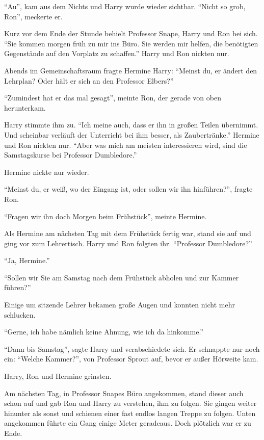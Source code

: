 \enquote{Au}, kam aus dem Nichts und Harry wurde wieder sichtbar. \enquote{Nicht so grob, Ron}, meckerte er.

Kurz vor dem Ende der Stunde behielt Professor Snape, Harry und Ron bei sich. \enquote{Sie kommen morgen früh zu mir ins Büro. Sie werden mir helfen, die benötigten Gegenstände auf den Vorplatz zu schaffen.} Harry und Ron nickten nur.

Abends im Gemeinschaftsraum fragte Hermine Harry: \enquote{Meinst du, er ändert den Lehrplan? Oder hält er sich an den Professor Elbers?}

\enquote{Zumindest hat er das mal gesagt}, meinte Ron, der gerade von oben herunterkam.

Harry stimmte ihm zu. \enquote{Ich meine auch, dass er ihn in großen Teilen übernimmt. Und scheinbar verläuft der Unterricht bei ihm besser, als Zaubertränke.} Hermine und Ron nickten nur. \enquote{Aber was mich am meisten interessieren wird, sind die Samstagskurse bei Professor Dumbledore.}

Hermine nickte nur wieder.

\enquote{Meinst du, er weiß, wo der Eingang ist, oder sollen wir ihn hinführen?}, fragte Ron.

\enquote{Fragen wir ihn doch Morgen beim Frühstück}, meinte Hermine.

\trenn

Als Hermine am nächsten Tag mit dem Frühstück fertig war, stand sie auf und ging vor zum Lehrertisch. Harry und Ron folgten ihr. \enquote{Professor Dumbledore?}

\enquote{Ja, Hermine.}

\enquote{Sollen wir Sie am Samstag nach dem Frühstück abholen und zur Kammer führen?}

Einige um sitzende Lehrer bekamen große Augen und konnten nicht mehr schlucken.

\enquote{Gerne, ich habe nämlich keine Ahnung, wie ich da hinkomme.}

\enquote{Dann bis Samstag}, sagte Harry und verabschiedete sich. Er schnappte nur noch ein: \enquote{Welche Kammer?}, von Professor Sprout auf, bevor er außer Hörweite kam.

Harry, Ron und Hermine grinsten.

Am nächsten Tag, in Professor Snapes Büro angekommen, stand dieser auch schon auf und gab Ron und Harry zu verstehen, ihm zu folgen. Sie gingen weiter hinunter als sonst und schienen einer fast endlos langen Treppe zu folgen. Unten angekommen führte ein Gang einige Meter geradeaus. Doch plötzlich war er zu Ende.

